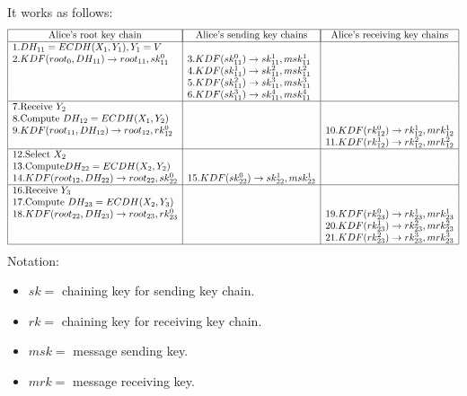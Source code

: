 \documentclass[12pt,titlepage]{article}
\begin{document}
It works as follows: $$\begin{array}{|l|l|l|}
	\hline
	\multicolumn{1}{|c|}{\text{Alice’s root key chain}} & \multicolumn{1}{|c|}{\text{Alice’s sending key chains}} & \multicolumn{1}{|c|}{\text{Alice’s receiving key chains}}\\
	\hline
	1. DH_{11} = ECDH(X_1, Y_1), Y_1 = V &&\\
	2. KDF(root_0, DH_{11} ) \rightarrow root_{11}, sk_{11}^0 & 3. KDF(sk_{11}^0) \rightarrow sk_{11}^1 , msk_{11}^1 &\\
	&4. KDF(sk_{11}^1) \rightarrow sk_{11}^2 , msk_{11}^2&\\
	&5. KDF(sk_{11}^2) \rightarrow sk_{11}^3 , msk_{11}^3&\\
	&6. KDF(sk_{11}^3) \rightarrow sk_{11}^4 , msk_{11}^4&\\
	\hline
	7. \text{Receive } Y_2 &&\\
	8. \text{Compute } DH_{12} = ECDH(X_1, Y_2)&&\\
	9. KDF(root_{11}, DH_{12}) \rightarrow root_{12}, rk_{12}^0 & & 10. KDF(rk_{12}^0) \rightarrow rk_{12}^1, mrk_{12}^1\\
	&&11. KDF(rk_{12}^1) \rightarrow rk_{12}^2, mrk_{12}^2\\
	\hline
	12. \text{Select } X_2&&\\
	13. \text{Compute} DH_{22} = ECDH(X_2, Y_2)&&\\
	14. KDF(root_{12}, DH_{22}) \rightarrow root_{22}, sk_{22}^0 & 15. KDF(sk_{22}^0) \rightarrow sk_{22}^1, msk_{22}^1&\\
	\hline
	16. \text{Receive } Y_3 &&\\
	17. \text{Compute } DH_{23} = ECDH(X_2, Y_3)&&\\
	18. KDF(root_{22} , DH_{23} ) \rightarrow root_{23}, rk_{23}^0&&19. KDF(rk_{23}^0) \rightarrow rk_{23}^1, mrk_{23}^1\\
	&&20. KDF(rk_{23}^1) \rightarrow rk_{23}^2, mrk_{23}^2\\
	&&21. KDF(rk_{23}^2) \rightarrow rk_{23}^3, mrk_{23}^3\\
	\hline
\end{array}$$
Notation: \begin{itemize}
	\item $sk =$ chaining key for sending key chain. 
	\item $rk =$ chaining key for receiving key chain. 
	\item $msk =$ message sending key. 
	\item $mrk =$ message receiving key.
\end{itemize}
\end{document}
